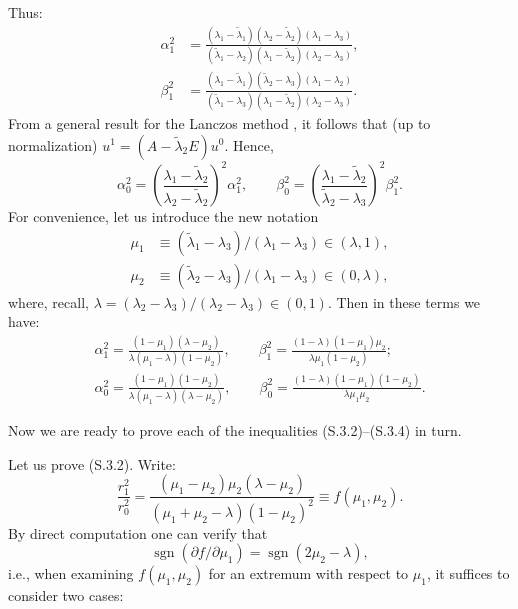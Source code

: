 \documentclass[11pt,oneside]{book}
\begin{document}
Thus:
\begin{align*}
\alpha_1^2 &= \frac{(\lambda_1 - \tilde{\lambda}_1)(\lambda_2 - \tilde{\lambda}_2)(\lambda_1 - \lambda_3)}{(\tilde{\lambda}_1 - \lambda_2)(\lambda_1 - \tilde{\lambda}_2)(\lambda_2 - \lambda_3)}, \\[1ex]
\beta_1^2 &= \frac{(\lambda_1 - \tilde{\lambda}_1)(\tilde{\lambda}_2 - \lambda_3)(\lambda_1 - \lambda_2)}{(\tilde{\lambda}_1 - \lambda_3)(\lambda_1 - \tilde{\lambda}_2)(\lambda_2 - \lambda_3)}.
\end{align*}
From a general result for the Lanczos method \citep[p.~259]{Parlett1983}, it follows that (up to normalization) $u^1 = (A - \tilde{\lambda}_2 E) u^0$. Hence,
\[
\alpha_0^2 = \left( \frac{\lambda_1 - \tilde{\lambda}_2}{\lambda_2 - \tilde{\lambda}_2} \right)^2 \alpha_1^2, \qquad
\beta_0^2 = \left( \frac{\lambda_1 - \tilde{\lambda}_2}{\tilde{\lambda}_2 - \lambda_3} \right)^2 \beta_1^2.
\]
For convenience, let us introduce the new notation
\begin{align*}
\mu_1 &\equiv (\tilde{\lambda}_1 - \lambda_3) / (\lambda_1 - \lambda_3) \in (\lambda, 1), \\
\mu_2 &\equiv (\tilde{\lambda}_2 - \lambda_3) / (\lambda_1 - \lambda_3) \in (0, \lambda),
\end{align*}
where, recall, $\lambda = (\lambda_2 - \lambda_3) / (\lambda_2 - \lambda_3) \in (0, 1)$. %
Then in these terms we have:
\begin{gather*}
\alpha_1^2 = \frac{(1 - \mu_1)(\lambda - \mu_2)}{\lambda(\mu_1 - \lambda)(1 - \mu_2)}, \qquad
\beta_1^2 = \frac{(1 - \lambda)(1 - \mu_1)\mu_2}{\lambda \mu_1 (1 - \mu_2)}; \\[1ex]
\alpha_0^2 = \frac{(1 - \mu_1)(1 - \mu_2)}{\lambda(\mu_1 - \lambda)(\lambda - \mu_2)}, \qquad
\beta_0^2 = \frac{(1 - \lambda)(1 - \mu_1)(1 - \mu_2)}{\lambda \mu_1 \mu_2}.
\end{gather*}

Now we are ready to prove each of the inequalities (S.3.2)--(S.3.4) in turn.

Let us prove (S.3.2). Write:
\[
\frac{r_1^2}{r_0^2} = \frac{(\mu_1 - \mu_2)\mu_2(\lambda - \mu_2)}{(\mu_1 + \mu_2 - \lambda)(1 - \mu_2)^2} \equiv f(\mu_1, \mu_2).
\]
By direct computation one can verify that
\[
\operatorname{sgn}(\partial f / \partial \mu_1) = \operatorname{sgn}(2\mu_2 - \lambda),
\]
i.e., when examining $f(\mu_1, \mu_2)$ for an extremum with respect to $\mu_1$, it suffices to consider two cases:
\end{document}
